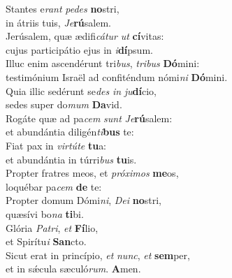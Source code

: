 \evenverse Stantes e\textit{rant} \textit{pe}\textit{des} \textbf{no}stri,~\*\\
\evenverse in átriis tuis, \textit{Je}\textbf{rú}salem.\\
\oddverse Jerúsalem, quæ ædifi\textit{cá}\textit{tur} \textit{ut} \textbf{cí}vitas:~\*\\
\oddverse cujus participátio ejus in \textit{i}\textbf{dí}psum.\\
\evenverse Illuc enim ascendérunt tri\textit{bus}, \textit{tri}\textit{bus} \textbf{Dó}mini:~\*\\
\evenverse testimónium Israël ad confiténdum nómi\textit{ni} \textbf{Dó}mini.\\
\oddverse Quia illic sedérunt se\textit{des} \textit{in} \textit{ju}\textbf{dí}cio,~\*\\
\oddverse sedes super do\textit{mum} \textbf{Da}vid.\\
\evenverse Rogáte quæ ad pa\textit{cem} \textit{sunt} \textit{Je}\textbf{rú}salem:~\*\\
\evenverse et abundántia diligén\textit{ti}\textbf{bus} te:\\
\oddverse Fiat pax in \textit{vir}\textit{tú}\textit{te} \textbf{tu}a:~\*\\
\oddverse et abundántia in túrri\textit{bus} \textbf{tu}is.\\
\evenverse Propter fratres meos, et \textit{pró}\textit{xi}\textit{mos} \textbf{me}os,~\*\\
\evenverse loquébar pa\textit{cem} \textbf{de} te:\\
\oddverse Propter domum Dómi\textit{ni}, \textit{De}\textit{i} \textbf{no}stri,~\*\\
\oddverse quæsívi bo\textit{na} \textbf{ti}bi.\\
\evenverse Glória \textit{Pa}\textit{tri}, \textit{et} \textbf{Fí}lio,~\*\\
\evenverse et Spirítu\textit{i} \textbf{San}cto.\\
\oddverse Sicut erat in princípio, \textit{et} \textit{nunc}, \textit{et} \textbf{sem}per,~\*\\
\oddverse et in sǽcula sæculó\textit{rum}. \textbf{A}men.\\

